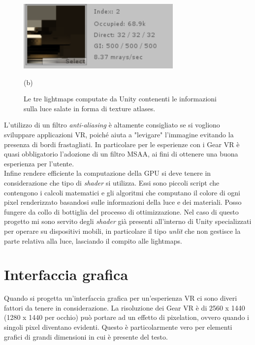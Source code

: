 \begin{figure}[H]
\begin{minipage}[b]{0.49\textwidth}
		\includegraphics[width=\textwidth]{figure/Lightmap3}
		{\footnotesize \centerline{(b)} \par}
	\end{minipage}
	\caption{Le tre lightmaps computate da Unity contenenti le informazioni sulla luce salate in forma di texture atlases.}
\end{figure}
L'utilizzo di un filtro \textit{anti-aliasing} è altamente consigliato se si vogliono sviluppare applicazioni VR, poiché aiuta a "levigare" l'immagine evitando la presenza di bordi frastagliati. In particolare per le esperienze con i Gear VR è quasi obbligatorio l'adozione di un filtro MSAA, ai fini di ottenere una buona esperienza per l'utente. \\

Infine rendere efficiente la computazione della GPU si deve tenere in considerazione che tipo di \textit{shader} si utilizza. Essi sono piccoli script che contengono i calcoli matematici e gli algoritmi che computano il colore di ogni pixel renderizzato basandosi sulle informazioni della luce e dei materiali. Posso fungere da collo di bottiglia del processo di ottimizzazione. Nel caso di questo progetto mi sono servito degli \textit{shader} già presenti all'interno di Unity specializzati per operare su dispositivi mobili, in particolare il tipo \textit{unlit} che non gestisce la parte relativa alla luce, lasciando il compito alle lightmaps.

\newpage

\section{Interfaccia grafica}

Quando si progetta un'interfaccia grafica per un'esperienza VR ci sono diveri fattori da tenere in considerazione. La risoluzione dei Gear VR è di 2560 x 1440 (1280 x 1440 per occhio) può portare ad un effetto di pixelation, ovvero quando i singoli pixel diventano evidenti. Questo è particolarmente vero per elementi grafici di grandi dimensioni in cui è presente del testo.\\

